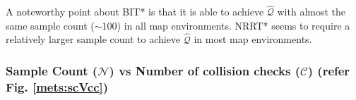 \documentclass{article}
\begin{document}
A noteworthy point about BIT* is that it is able to achieve $\hat{\mathcal{Q}}$ with almost the same sample count ($\sim 100$) in all map environments. NRRT* seems to require a relatively larger sample count to achieve $\hat{\mathcal{Q}}$ in most map environments.

\subsubsection{Sample Count ($\mathcal{N}$) vs Number of collision checks ($\mathcal{C}$) (refer Fig. \ref{mets:scVcc})}

\begin{figure}
\end{figure}
\end{document}
